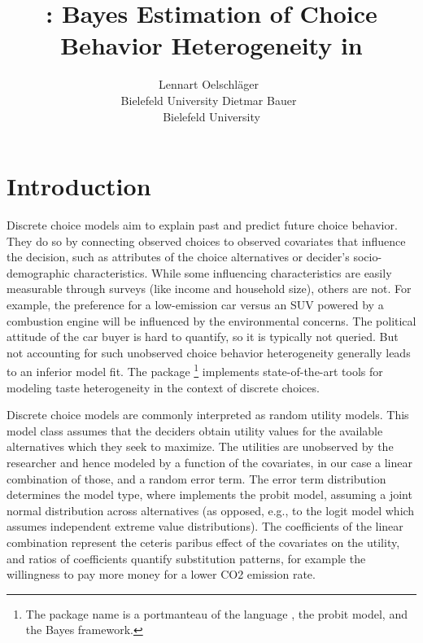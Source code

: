 \documentclass[article,shortnames]{jss}
\author{Lennart Oelschl\"ager~\orcidlink{0000-0001-5421-9313}\\Bielefeld University \And Dietmar Bauer~\orcidlink{0000-0003-2920-7032}\\Bielefeld University}
\title{\pkg{RprobitB}: Bayes Estimation of Choice Behavior Heterogeneity in \proglang{R}}
\newcommand{\fct}[1]{\code{#1()}}
\begin{document}


\section{Introduction}
\label{sec:introduction}

Discrete choice models aim to explain past and predict future choice behavior. They do so by connecting observed choices to observed covariates that influence the decision, such as attributes of the choice alternatives or decider's socio-demographic characteristics. While some influencing characteristics are easily measurable through surveys (like income and household size), others are not. For example, the preference for a low-emission car versus an SUV powered by a combustion engine will be influenced by the environmental concerns. The political attitude of the car buyer is hard to quantify, so it is typically not queried. But not accounting for such unobserved choice behavior heterogeneity generally leads to an inferior model fit. The  \citep{R} package \footnote{The package name is a portmanteau of the language , the probit model, and the Bayes framework.} \citep{Oelschlaeger:2021} implements state-of-the-art tools for modeling taste heterogeneity in the context of discrete choices.

Discrete choice models are commonly interpreted as random utility models. This model class assumes that the deciders obtain utility values for the available alternatives which they seek to maximize. The utilities are unobserved by the researcher and hence modeled by a function of the covariates, in our case a linear combination of those, and a random error term. The error term distribution determines the model type, where  implements the probit model, assuming a joint normal distribution across alternatives (as opposed, e.g., to the logit model which assumes independent extreme value distributions). The coefficients of the linear combination represent the ceteris paribus effect of the covariates on the utility, and ratios of coefficients quantify substitution patterns, for example the willingness to pay more money for a lower CO2 emission rate.
\end{document}
